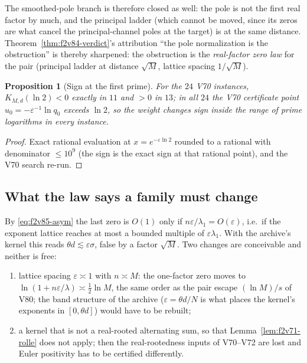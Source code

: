 \documentclass[11pt]{article}
\newtheorem{proposition}[theorem]{Proposition}
\theoremstyle{definition}
\theoremstyle{remark}
\begin{document}
The smoothed-pole branch is therefore closed as well: the pole is not
the first real factor by much, and the principal ladder (which cannot be
moved, since its zeros are what cancel the principal-channel poles at
the target) is at the same distance.  Theorem~\ref{thm:f2v84-verdict}'s
attribution ``the pole normalization is the obstruction'' is thereby
sharpened: the obstruction is the \emph{real-factor zero law} for the
pair (principal ladder at distance \(\sqrt M\), lattice spacing
\(1/\sqrt M\)).

\begin{proposition}[Sign at the first prime]
\label{prop:f2v85-first-prime}
For the \(24\) V70 instances, \(K_{M,d}(\ln2)<0\) exactly in \(11\) and
\(>0\) in \(13\); in all \(24\) the V70 certificate point
\(u_0=-\varepsilon^{-1}\ln q_0\) exceeds \(\ln2\), so the weight changes
sign inside the range of prime logarithms in every instance.
\end{proposition}

\begin{proof}
Exact rational evaluation at \(x=e^{-\varepsilon\ln2}\) rounded to a
rational with denominator \(\le10^9\) (the sign is the exact sign at
that rational point), and the V70 search re-run.
\end{proof}

\subsection{What the law says a family must change}

By \eqref{eq:f2v85-asym} the last zero is \(O(1)\) only if
\(n\varepsilon/\lambda_1=O(\varepsilon)\), i.e.\ if the exponent lattice
reaches at most a bounded multiple of \(\varepsilon\lambda_1\).  With the
archive's kernel this reads \(\theta d\lesssim\varepsilon\sigma\), false
by a factor \(\sqrt M\).  Two changes are conceivable and neither is
free:
\begin{enumerate}[label=\textup{(\alph*)}]
\item lattice spacing \(\varepsilon\asymp1\) with \(n\asymp M\): the
one-factor zero moves to \(\ln(1+n\varepsilon/\lambda)\asymp\tfrac12\ln M\),
the same order as the pair escape \((\ln M)/s\) of V80; the band
structure of the archive (\(\varepsilon=\theta d/N\) is what places the
kernel's exponents in \([0,\theta d]\)) would have to be rebuilt;
\item a kernel that is not a real-rooted alternating sum, so that
Lemma~\ref{lem:f2v71-rolle} does not apply; then the real-rootedness
inputs of V70--V72 are lost and Euler positivity has to be certified
differently.
\end{enumerate}
\end{document}
